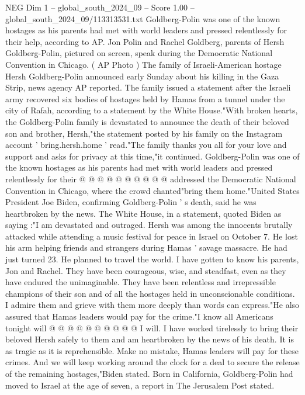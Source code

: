 \begin{textsample}{NEG Dim 1 – global\_south\_2024\_09 – Score 1.00 – global\_south\_2024\_09/113313531.txt}  \label{ex:f1_neg_425}
Goldberg-Polin was one of the known hostages as his parents had met with world leaders and pressed relentlessly for their help, according to AP.
Jon Polin and Rachel Goldberg, parents of Hersh Goldberg-Polin, pictured on screen, speak during the Democratic National Convention in Chicago. ( AP Photo ) The family of Israeli-American hostage Hersh Goldberg-Polin announced early Sunday about his killing in the Gaza Strip, news agency AP reported.
The family issued a statement after the Israeli army recovered six bodies of hostages held by Hamas from a tunnel under the city of Rafah, according to a statement by the White House."With broken hearts, the Goldberg-Polin family is devastated to announce the death of their beloved son and brother, Hersh,"the statement posted by his family on the Instagram account ' bring.hersh.home ' read."The family thanks you all for your love and support and asks for privacy at this time,"it continued.
Goldberg-Polin was one of the known hostages as his parents had met with world leaders and pressed relentlessly for their @ @ @ @ @ @ @ @ @ @ addressed the Democratic National Convention in Chicago, where the crowd chanted"bring them home."United States President Joe Biden, confirming Goldberg-Polin ' s death, said he was heartbroken by the news.
The White House, in a statement, quoted Biden as saying :"I am devastated and outraged.
Hersh was among the innocents brutally attacked while attending a music festival for peace in Israel on October 7.
He lost his arm helping friends and strangers during Hamas ' savage massacre.
He had just turned 23.
He planned to travel the world.
I have gotten to know his parents, Jon and Rachel.
They have been courageous, wise, and steadfast, even as they have endured the unimaginable.
They have been relentless and irrepressible champions of their son and of all the hostages held in unconscionable conditions.
I admire them and grieve with them more deeply than words can express."He also assured that Hamas leaders would pay for the crime."I know all Americans tonight will @ @ @ @ @ @ @ @ @ @ I will.
I have worked tirelessly to bring their beloved Hersh safely to them and am heartbroken by the news of his death.
It is as tragic as it is reprehensible.
Make no mistake, Hamas leaders will pay for these crimes.
And we will keep working around the clock for a deal to secure the release of the remaining hostages,"Biden stated.
Born in California, Goldberg-Polin had moved to Israel at the age of seven, a report in The Jerusalem Post stated.

\end{textsample}
